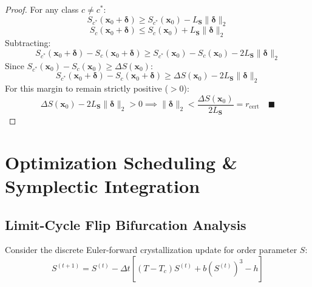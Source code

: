 \documentclass[journal,twoside]{IEEEtran}
\theoremstyle{remark}
\begin{document}
\begin{proof}
For any class $c \ne c^*$:
\begin{equation*}
    S_{c^*}(\mathbf{x}_0 + \boldsymbol{\delta}) \ge S_{c^*}(\mathbf{x}_0) - L_{\mathbf{S}} \|\boldsymbol{\delta}\|_2
\end{equation*}
\begin{equation*}
    S_c(\mathbf{x}_0 + \boldsymbol{\delta}) \le S_c(\mathbf{x}_0) + L_{\mathbf{S}} \|\boldsymbol{\delta}\|_2
\end{equation*}
Subtracting:
\begin{equation*}
    S_{c^*}(\mathbf{x}_0 + \boldsymbol{\delta}) - S_c(\mathbf{x}_0 + \boldsymbol{\delta}) \ge S_{c^*}(\mathbf{x}_0) - S_c(\mathbf{x}_0) - 2 L_{\mathbf{S}} \|\boldsymbol{\delta}\|_2
\end{equation*}
Since $S_{c^*}(\mathbf{x}_0) - S_c(\mathbf{x}_0) \ge \Delta S(\mathbf{x}_0)$:
\begin{equation*}
    S_{c^*}(\mathbf{x}_0 + \boldsymbol{\delta}) - S_c(\mathbf{x}_0 + \boldsymbol{\delta}) \ge \Delta S(\mathbf{x}_0) - 2 L_{\mathbf{S}} \|\boldsymbol{\delta}\|_2
\end{equation*}
For this margin to remain strictly positive ($> 0$):
\begin{equation*}
    \Delta S(\mathbf{x}_0) - 2 L_{\mathbf{S}} \|\boldsymbol{\delta}\|_2 > 0 \implies \|\boldsymbol{\delta}\|_2 < \frac{\Delta S(\mathbf{x}_0)}{2 L_{\mathbf{S}}} = r_{\text{cert}} \quad \blacksquare
\end{equation*}
\end{proof}

\section{Optimization Scheduling \& Symplectic Integration}

\subsection{Limit-Cycle Flip Bifurcation Analysis}
Consider the discrete Euler-forward crystallization update for order parameter $S$:
\begin{equation}
    S^{(t+1)} = S^{(t)} - \Delta t \left[ (T - T_c) S^{(t)} + b (S^{(t)})^3 - h \right]
\end{equation}
\end{document}
